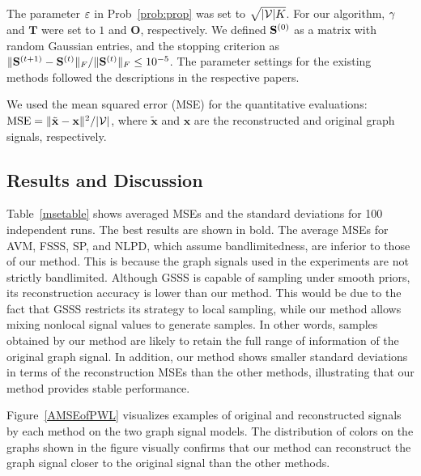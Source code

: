 \documentclass[10pt,journal]{IEEEtran}
\theoremstyle{plain}
\newcommand{\varx}{\mathbf{x}}
\begin{document}
The parameter $\varepsilon$ in Prob~\eqref{prob:prop} was set to $\sqrt{|\mathcal{V}|K}$.
For our algorithm, $\gamma$ and $\mathbf{T}$ were set to $1$ and $\mathbf{O}$, respectively. We defined $\mathbf{S}^{(0)}$ as a matrix with random Gaussian entries, and the stopping criterion as $\|\mathbf{S}^{(t + 1)} - \mathbf{S}^{(t)}\|_{F}/\|\mathbf{S}^{(t)}\|_{F} \leq 10^{-5}$.
The parameter settings for the existing methods followed the descriptions in the respective papers.

We used the mean squared error (MSE) for the quantitative evaluations: $\mathrm{MSE} = \|\tilde{\varx} - \varx\|^{2}/\numV$, where $\tilde{\varx}$ and $\varx$ are the reconstructed and original graph signals, respectively.

      \vspace{-3mm}
\subsection{Results and Discussion}
Table~\ref{msetable} shows averaged MSEs and the standard deviations for 100 independent runs.
The best results are shown in bold. The average MSEs for AVM, FSSS, SP, and NLPD, which assume bandlimitedness, are inferior to those of our method. This is because the graph signals used in the experiments are not strictly bandlimited.
Although GSSS is capable of sampling under smooth priors, its reconstruction accuracy is lower than our method. This would be due to the fact that GSSS restricts its strategy to local sampling, while our method allows mixing nonlocal signal values to generate samples. In other words, samples obtained by our method are likely to retain the full range of information of the original graph signal. In addition, our method shows smaller standard deviations in terms of the reconstruction MSEs than the other methods, illustrating that our method provides stable performance.

Figure~\ref{AMSEofPWL} visualizes examples of original and reconstructed signals by each method on the two graph signal models.
The distribution of colors on the graphs shown in the figure visually confirms that our method can reconstruct the graph signal closer to the original signal than the other methods.
\end{document}
